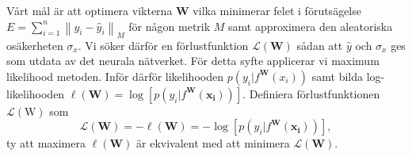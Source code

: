Vårt mål är att optimera vikterna $\mathbf{W}$ vilka minimerar felet i förutsägelse $E = \sum_{i=1}^n \left\|y_i - \hat{y}_i\right\|_M$ för någon metrik $M$ samt approximera den aleatoriska osäkerheten $\sigma_x$.  Vi söker därför en förlustfunktion $\mathcal{L}(\mathbf{W})$ sådan att $\hat{y}$ och $\sigma_x$ ges som utdata av det neurala nätverket. För detta syfte applicerar vi maximum likelihood metoden. Inför därför likelihooden $p\left(y_i|f^\mathbf{W}(x_i)\right)$ samt bilda log-likelihooden $\ell(\mathbf{W}) = \log \left[p\left(y_i|f^\mathbf{W}(\mathbf{x_i})\right)\right]$. Definiera förlustfunktionen $\mathcal{L}(\mathrm{W})$ som 
\begin{equation}
    \mathcal{L}(\mathbf{W}) = -\ell(\mathbf{W}) = -\log \left[p\left(y_i|f^\mathbf{W}(\mathbf{x_i})\right)\right],
\label{eq:def_loss_fcn}
\end{equation}
ty att maximera $\ell(\mathbf{W})$ är ekvivalent med att minimera $\mathcal{L}(\mathbf{W})$.

